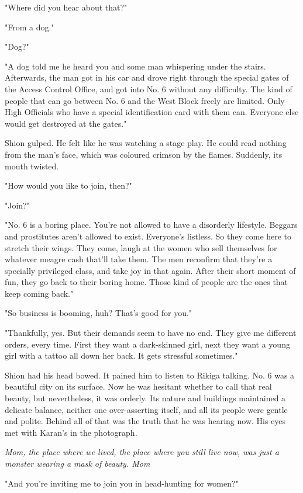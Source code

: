 "\el Where did you hear about that?"

"From a dog."

"Dog?"

"A dog told me he heard you and some man whispering under the stairs.
Afterwards, the man got in his car and drove right through the special
gates of the Access Control Office, and got into No. 6 without any
difficulty. The kind of people that can go between No. 6 and the West
Block freely are limited. Only High Officials who have a special
identification card with them can. Everyone else would get destroyed at
the gates."

Shion gulped. He felt like he was watching a stage play. He could read
nothing from the man's face, which was coloured crimson by the flames.
Suddenly, its mouth twisted.

"How would you like to join, then?"

"Join?"

"No. 6 is a boring place. You're not allowed to have a disorderly
lifestyle. Beggars and prostitutes aren't allowed to exist. Everyone's
listless. So they come here to stretch their wings. They come, laugh at
the women who sell themselves for whatever meagre cash that'll take
them. The men reconfirm that they're a specially privileged class, and
take joy in that again. After their short moment of fun, they go back to
their boring home. Those kind of people are the ones that keep coming
back."

"So business is booming, huh? That's good for you."

"Thankfully, yes. But their demands seem to have no end. They give me
different orders, every time. First they want a dark-skinned girl, next
they want a young girl with a tattoo all down her back. It gets
stressful sometimes."

Shion had his head bowed. It pained him to listen to Rikiga talking. No.
6 was a beautiful city on its surface. Now he was hesitant whether to
call that real beauty, but nevertheless, it was orderly. Its nature and
buildings maintained a delicate balance, neither one over-asserting
itself, and all its people were gentle and polite. Behind all of that
was the truth that he was hearing now. His eyes met with Karan's in the
photograph.

\emph{Mom, the place where we lived, the place where you still live now, was
just a monster wearing a mask of beauty. Mom\el }

"And you're inviting me to join you in head-hunting for women?"

